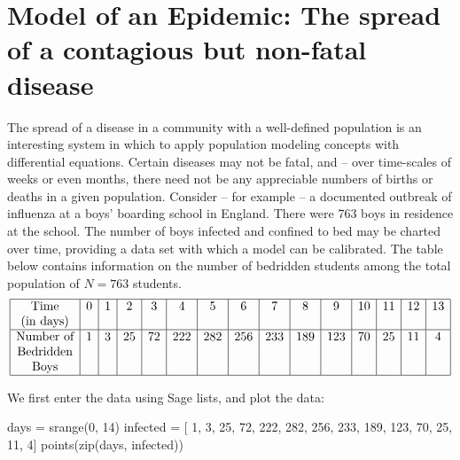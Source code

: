 \documentclass{ximera}
\begin{document}
\section*{Model of an Epidemic: The spread of a contagious but non-fatal disease} 

The spread of a disease in a community with a well-defined population is an interesting system in which to apply population modeling concepts with differential equations.  Certain diseases may not be fatal, and -- over time-scales of weeks or even months, there need not be any appreciable numbers of births or deaths in a given population.  Consider – for example – a documented outbreak of influenza at a boys' boarding school in England.  There were 763 boys in residence at the school.  The number of boys infected and confined to bed may be charted over time, providing a data set with which a model can be calibrated.  The table below contains information on the number of bedridden students among the total population of $N=763$ students.
$$ 
\begin{array}{|c|c|c|c|c|c|c|c|c|c|c|c|c|c|c|c|c|c|c|c|c|c|}\hline
\text{Time}           & 0 & 1 &  2 &  3 &  4 & 5 &   6  & 7 &   8 &   9 & 10 & 11 & 12 & 13  \\
\text{(in days)}&  &  &   &   &   &     &     &  &    &    &  &  &  & 
\\\hline
\text{Number of} &1 & 3 & 25 & 72 & 222 & 282 & 256 & 233 & 189 & 123 & 70 & 25 & 11 &  4 \\
\text{Bedridden} & &  &   &   &   &     &     &  &    &    &  &  &  & \\
\text{Boys} & &  &   &   &   &     &     &  &    &    &  &  &  & \\\hline
\end{array}
$$

We first enter the data using Sage lists, and plot the data:
 
\begin{sageCell}
days = srange(0, 14)
infected = [  1,   3,  25, 72, 222, 282, 256,
            233, 189, 123, 70,  25,  11,   4]
points(zip(days, infected))
\end{sageCell}
\end{document}
